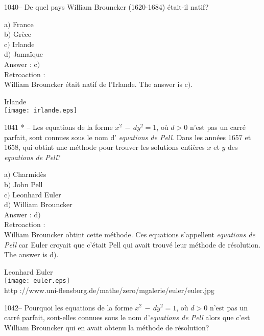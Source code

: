 ﻿\documentclass[letterpaper, 12pt]{article}
\begin{document}
1040-- De quel pays William Brouncker (1620-1684) \'etait-il natif?

a$)$ France  \\
b$)$ Gr\`ece  \\
c$)$ Irlande \\
d$)$ Jama\"ique\\

Answer : c$)$\\

Retroaction : \\
William Brouncker \'etait natif de l'Irlande.
The answer is c$)$.\\
        \begin{center}
        Irlande\\
    \texttt{[image: irlande.eps]}\\
    \end{center}

1041 * -- Les equations de la forme $x^2\,-\,dy^2=1$, o\`u $d>0$
n'est pas un carr\'e parfait, sont connues sous le nom d'{\sl
equations de Pell}. Dans les ann\'ees 1657 et 1658, qui obtint une
m\'ethode pour trouver les solutions enti\`eres $x$ et $y$ des {\sl
equations de Pell}?

a$)$ Charmid\`es \\
b$)$ John Pell \\
c$)$ Leonhard Euler  \\
d$)$ William Brouncker\\

Answer : d$)$\\

Retroaction : \\
William Brouncker obtint cette m\'ethode. Ces equations
s'appellent {\sl equations de Pell} car Euler croyait que
c'\'etait Pell qui avait trouv\'e leur m\'ethode de r\'esolution.
The answer is d$)$.\\

        \begin{center}
        Leonhard Euler\\
    \texttt{[image: euler.eps]}\\
        {\footnotesize http
://www.uni-flensburg.de/mathe/zero/mgalerie/euler/euler.jpg}
    \end{center}

1042-- Pourquoi les equations de la forme $x^2\,-\,dy^2=1$, o\`u
$d>0$ n'est pas un carr\'e parfait, sont-elles connues sous le nom
d'{\sl equations de Pell} alors que c'est William Brouncker qui en
avait obtenu la m\'ethode de r\'esolution?
\end{document}
